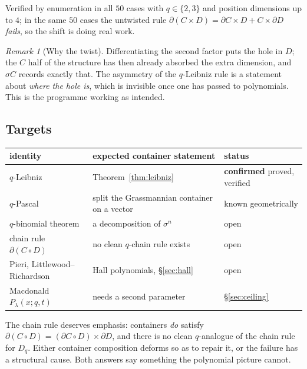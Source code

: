 \documentclass[11pt,a4paper]{article}
\theoremstyle{definition}
\theoremstyle{remark}
\newtheorem{remark}[theorem]{Remark}
\newcommand{\OK}{\textcolor{okgreen}{\textbf{confirmed}}}
\begin{document}
Verified by enumeration in all $50$ cases with $q \in \{2,3\}$ and position
dimensions up to $4$; in the same $50$ cases the untwisted rule
$\partial(C\times D) = \partial C \times D + C \times \partial D$ \emph{fails},
so the shift is doing real work.

\begin{remark}[Why the twist]
Differentiating the second factor puts the hole in $D$; the $C$ half of the
structure has then already absorbed the extra dimension, and $\sigma C$ records
exactly that. The asymmetry of the $q$-Leibniz rule is a statement about
\emph{where the hole is}, which is invisible once one has passed to polynomials.
This is the programme working as intended.
\end{remark}

\subsection{Targets}

\begin{center}
\small
\setlength{\tabcolsep}{4pt}
\begin{tabular}{@{}>{\raggedright\arraybackslash}p{}>{\raggedright\arraybackslash}p{}>{\raggedright\arraybackslash}p{}@{}}
\toprule
identity & expected container statement & status \\
\midrule
$q$-Leibniz & Theorem~\ref{thm:leibniz} & \OK{} proved, verified \\
$q$-Pascal & split the Grassmannian container on a vector & known geometrically \\
$q$-binomial theorem & a decomposition of $\sigma^{n}$ & open \\
chain rule $\partial(C \circ D)$ & no clean $q$-chain rule exists & open \\
Pieri, Littlewood--Richardson & Hall polynomials, \S\ref{sec:hall} & open \\
Macdonald $P_\lambda(x;q,t)$ & needs a second parameter & \S\ref{sec:ceiling} \\
\bottomrule
\end{tabular}
\end{center}

The chain rule deserves emphasis: containers \emph{do} satisfy
$\partial(C \circ D) = (\partial C \circ D)\times \partial D$, and there is no clean
$q$-analogue of the chain rule for $D_q$. Either container composition deforms so as
to repair it, or the failure has a structural cause. Both answers say something the
polynomial picture cannot.
\end{document}
